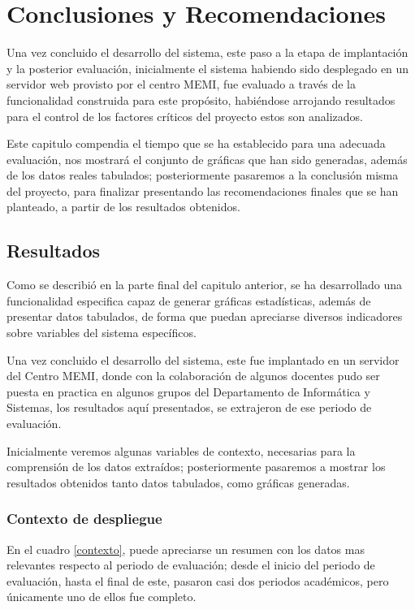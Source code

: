 \chapter{Conclusiones y Recomendaciones}

Una vez concluido el desarrollo del sistema, este paso a la etapa de
implantación y la posterior evaluación, inicialmente el sistema habiendo sido
desplegado en un servidor web provisto por el centro MEMI, fue evaluado a través
de la funcionalidad construida para este propósito, habiéndose arrojando
resultados para el control de los factores críticos del proyecto estos son
analizados.

Este capitulo compendia el tiempo que se ha establecido para una adecuada
evaluación, nos mostrará el conjunto de gráficas que han sido generadas, además
de los datos reales tabulados; posteriormente pasaremos a la conclusión misma
del proyecto, para finalizar presentando las recomendaciones finales que se han
planteado, a partir de los resultados obtenidos.

\section{Resultados}
Como se describió en la parte final del capitulo anterior, se ha desarrollado
una funcionalidad especifica capaz de generar gráficas estadísticas, además de
presentar datos tabulados, de forma que puedan apreciarse diversos indicadores
sobre variables del sistema específicos.

Una vez concluido el desarrollo del sistema, este fue implantado en un servidor
del Centro MEMI, donde con la colaboración de algunos docentes pudo ser puesta
en practica en algunos grupos del Departamento de Informática y Sistemas, los
resultados aquí presentados, se extrajeron de ese periodo  de evaluación.

Inicialmente veremos algunas variables de contexto, necesarias para la
comprensión de los datos extraídos; posteriormente pasaremos a mostrar los
resultados obtenidos tanto datos tabulados, como gráficas generadas.

\subsection{Contexto de despliegue}
En el cuadro \ref{contexto}, puede apreciarse un resumen con los datos mas
relevantes respecto al periodo de evaluación; desde el inicio del periodo de
evaluación, hasta el final de este, pasaron casi dos periodos académicos, pero
únicamente uno de ellos fue completo.

